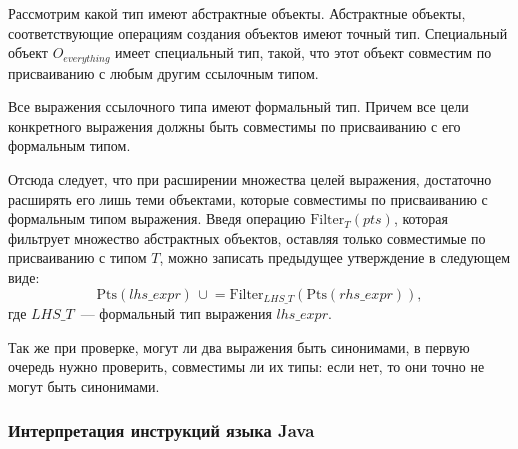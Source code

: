\documentclass[14pt,titlepage]{extarticle}
\newcommand{\Pts}[1]{\textrm{Pts}(#1)}
\newcommand{\Filter}[2]{\textrm{Filter}_{#1}(#2)}
\newcommand{\cupe}{\,\cup\!\!=}
\begin{document}
      Рассмотрим какой тип имеют абстрактные объекты. Абстрактные объекты,
      соответствующие операциям создания объектов имеют точный тип.
      Специальный объект $O_{everything}$ имеет специальный тип, такой, что
      этот объект совместим по присваиванию с любым другим ссылочным типом.

      Все выражения ссылочного типа имеют формальный тип. Причем все цели
      конкретного выражения должны быть совместимы по присваиванию с его
      формальным типом.

      Отсюда следует, что при расширении множества целей выражения, достаточно
      расширять его лишь теми объектами, которые совместимы по присваиванию с
      формальным типом выражения.
      Введя операцию $\Filter{T}{pts}$, которая фильтрует множество
      абстрактных объектов, оставляя только совместимые по присваиванию с типом
      $T$, можно записать предыдущее утверждение в следующем виде:
      \[\Pts{lhs\_expr} \cupe \Filter{LHS\_T}{\Pts{rhs\_expr}},\]
      где $LHS\_T$~--- формальный тип выражения $lhs\_expr$.

      Так же при проверке, могут ли два выражения быть синонимами, в первую
      очередь нужно проверить, совместимы ли их типы: если нет, то они точно не
      могут быть синонимами.

      \subsubsection{Интерпретация инструкций языка Java}
\end{document}
